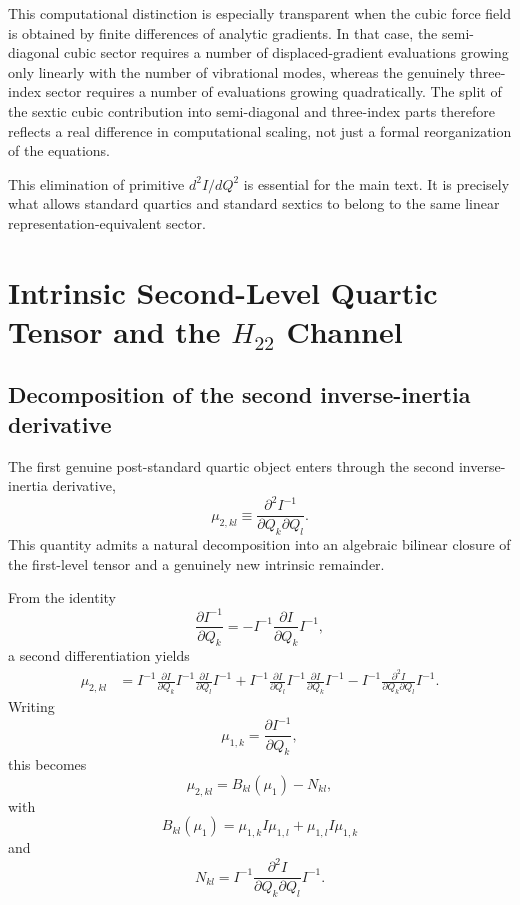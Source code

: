 This computational distinction is especially transparent when the cubic force
field is obtained by finite differences of analytic gradients. In that case,
the semi-diagonal cubic sector requires a number of displaced-gradient
evaluations growing only linearly with the number of vibrational modes,
whereas the genuinely three-index sector requires a number of evaluations
growing quadratically. The split of the sextic cubic contribution into
semi-diagonal and three-index parts therefore reflects a real difference in
computational scaling, not just a formal reorganization of the equations.\cite{cubic-vib_2024,fast_dvib_2025}

This elimination of primitive $d^2I/dQ^2$ is essential for the main text. It
is precisely what allows standard quartics and standard sextics to belong to
the same linear representation-equivalent sector.

\section{Intrinsic Second-Level Quartic Tensor and the \texorpdfstring{$H_{22}$}{H22} Channel}

\subsection{Decomposition of the second inverse-inertia derivative}

The first genuine post-standard quartic object enters through the second
inverse-inertia derivative,
\begin{equation}
\mu_{2,kl} \equiv \frac{\partial^2 I^{-1}}{\partial Q_k \partial Q_l}.
\end{equation}
This quantity admits a natural decomposition into an algebraic bilinear closure
of the first-level tensor and a genuinely new intrinsic remainder.

From the identity
\begin{equation}
\frac{\partial I^{-1}}{\partial Q_k}
=
-I^{-1}\frac{\partial I}{\partial Q_k}I^{-1},
\end{equation}
a second differentiation yields
\begin{align}
\mu_{2,kl}
&=
I^{-1}\frac{\partial I}{\partial Q_k}I^{-1}\frac{\partial I}{\partial Q_l}I^{-1}
+
I^{-1}\frac{\partial I}{\partial Q_l}I^{-1}\frac{\partial I}{\partial Q_k}I^{-1}
-
I^{-1}\frac{\partial^2 I}{\partial Q_k\partial Q_l}I^{-1}.
\end{align}
Writing
\begin{equation}
\mu_{1,k}=\frac{\partial I^{-1}}{\partial Q_k},
\end{equation}
this becomes
\begin{equation}
\mu_{2,kl} = B_{kl}(\mu_1) - N_{kl},
\label{eq:app_mu2_split}
\end{equation}
with
\begin{equation}
B_{kl}(\mu_1)=\mu_{1,k}I\mu_{1,l}+\mu_{1,l}I\mu_{1,k}
\end{equation}
and
\begin{equation}
N_{kl}=I^{-1}\frac{\partial^2 I}{\partial Q_k\partial Q_l}I^{-1}.
\end{equation}

